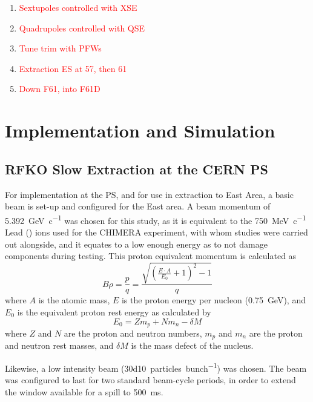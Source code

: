 \documentclass[11pt]{report}
\newcommand\todo[1]{\textcolor{red}{#1}}
\begin{document}
\begin{enumerate}
  \item \todo{Sextupoles controlled with XSE}
  \item \todo{Quadrupoles controlled with QSE}
  \item \todo{Tune trim with PFWs}
  \item \todo{Extraction ES at 57, then 61}
  \item \todo{Down F61, into F61D}
\end{enumerate}

\chapter{Implementation and Simulation}

\section{RFKO Slow Extraction at the CERN PS}

For implementation at the PS, and for use in extraction to East Area, a basic beam is set-up and configured for the East area. A beam momentum of \qty[per-mode=symbol]{5.392}{\giga\electronvolt\per~c} was chosen for this study, as it is equivalent to the \qty[per-mode=symbol]{750}{\mega\electronvolt\per~c} Lead () ions used for the CHIMERA experiment, with whom studies were carried out alongside, and it equates to a low enough energy as to not damage components during testing. This proton equivalent momentum is calculated as
\begin{equation}
  B\rho = \frac pq = \frac{\sqrt{\left(\frac{E\cdot A}{E_0}+1\right)^2-1}}q
  \label{eq:proton-equivalent}
\end{equation}
where $A$ is the atomic mass, $E$ is the proton energy per nucleon (\qty{0.75}{\giga\electronvolt}), and $E_0$ is the equivalent proton rest energy as calculated by
\begin{equation}
  E_0 = Zm_p + Nm_n - \delta M
\end{equation} where $Z$ and $N$ are the proton and neutron numbers, $m_p$ and $m_n$ are the proton and neutron rest masses, and $\delta M$ is the mass defect of the nucleus.

Likewise, a low intensity beam (\qty[per-mode=symbol]{30d10}{particles\per bunch}) was chosen. The beam was configured to last for two standard beam-cycle periods, in order to extend the window available for a spill to \qty{500}{\milli\second}.
\end{document}
